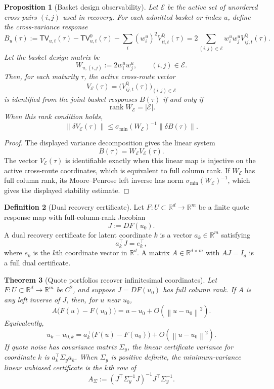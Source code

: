 \documentclass[11pt,a4paper]{amsart}
\theoremstyle{plain}
\newtheorem{theorem}{Theorem}[section]
\newtheorem{proposition}[theorem]{Proposition}
\theoremstyle{definition}
\newtheorem{definition}[theorem]{Definition}
\theoremstyle{remark}
\newcommand{\R}{\mathbb{R}}
\newcommand{\QQ}{\mathbb{Q}}
\newcommand{\cE}{\mathcal{E}}
\newcommand{\norm}[1]{\left\lVert #1\right\rVert}
\begin{document}
\begin{proposition}[Basket design observability]\label{prop:basket-design-observability}
Let \(\cE\) be the active set of unordered cross-pairs \((i,j)\) used in recovery.  For each
admitted basket or index \(u\), define the cross-variance response
\[
        B_u(\tau)
        :=
        \mathsf{TV}_{u,t}(\tau)-\mathsf{TV}_{u,t}^0(\tau)
        -
        \sum_i (w_i^u)^2V_{ii,t}^\QQ(\tau)
        =
        2\sum_{(i,j)\in\cE}w_i^u w_j^uV_{ij,t}^\QQ(\tau).
\]
Let the basket design matrix be
\[
        W_{u,(i,j)}:=2w_i^u w_j^u,\qquad (i,j)\in\cE .
\]
Then, for each maturity \(\tau\), the active cross-route vector
\[
        V_{\cE}(\tau)=\bigl(V_{ij,t}^\QQ(\tau)\bigr)_{(i,j)\in\cE}
\]
is identified from the joint basket responses \(B(\tau)\) if and only if
\[
        \operatorname{rank} W_{\cE}=|\cE|.
\]
When this rank condition holds,
\[
        \norm{\delta V_{\cE}(\tau)}
        \le
        \sigma_{\min}(W_{\cE})^{-1}\norm{\delta B(\tau)} .
\]
\end{proposition}

\begin{proof}
The displayed variance decomposition gives the linear system
\[
        B(\tau)=W_{\cE}V_{\cE}(\tau).
\]
The vector \(V_{\cE}(\tau)\) is identifiable exactly when this linear map is injective on the
active cross-route coordinates, which is equivalent to full column rank.  If \(W_{\cE}\) has full column rank, its Moore--Penrose left inverse has norm
\(\sigma_{\min}(W_{\cE})^{-1}\), which gives the displayed stability estimate.
\end{proof}

\begin{definition}[Dual recovery certificate]\label{def:dual-recovery-certificate}
Let \(F:U\subset\R^d\to\R^m\) be a finite quote response map with full-column-rank Jacobian
\[
        J:=DF(u_0).
\]
A dual recovery certificate for latent coordinate \(k\) is a vector \(a_k\in\R^m\) satisfying
\[
        a_k^\top J=e_k^\top,
\]
where \(e_k\) is the \(k\)th coordinate vector in \(\R^d\).  A matrix \(A\in\R^{d\times m}\)
with \(AJ=I_d\) is a full dual certificate.
\end{definition}

\begin{theorem}[Quote portfolios recover infinitesimal coordinates]\label{thm:dual-certificates}
Let \(F:U\subset\R^d\to\R^m\) be \(C^2\), and suppose \(J=DF(u_0)\) has full column rank.  If
\(A\) is any left inverse of \(J\), then, for \(u\) near \(u_0\),
\[
        A\bigl(F(u)-F(u_0)\bigr)
        =
        u-u_0+O(\norm{u-u_0}^2).
\]
Equivalently,
\[
        u_k-u_{0,k}
        =
        a_k^\top\bigl(F(u)-F(u_0)\bigr)
        +
        O(\norm{u-u_0}^2).
\]
If quote noise has covariance matrix \(\Sigma_y\), the linear certificate variance for coordinate
\(k\) is \(a_k^\top\Sigma_y a_k\).  When \(\Sigma_y\) is positive definite, the minimum-variance
linear unbiased certificate is the \(k\)th row of
\[
        A_{\Sigma}
        :=
        (J^\top\Sigma_y^{-1}J)^{-1}J^\top\Sigma_y^{-1}.
\]
\end{theorem}
\end{document}
